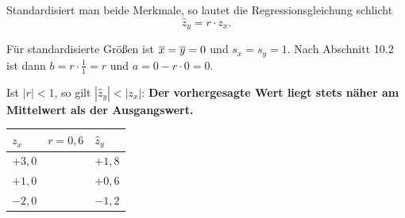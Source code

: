 \begin{merksatz}
Standardisiert man beide Merkmale, so lautet die Regressionsgleichung schlicht
\[ \hat z_y = r \cdot z_x . \]

Für standardisierte Größen ist $\overline{x} = \overline y = 0$ und $s_x = s_y = 1$. Nach Abschnitt 10.2 ist dann $b = r \cdot \frac{1}{1} = r$ und $a = 0 - r\cdot 0 = 0$.

Ist $|r| < 1$, so gilt $|\hat z_y| < |z_x|$: \textbf{Der vorhergesagte Wert liegt stets näher am Mittelwert als der Ausgangswert.}

\begin{center}
\renewcommand{\arraystretch}{1.48}
\begin{tabular}{@{}P{2.6cm}P{2.2cm}P{2.6cm}@{}}
\toprule
$z_x$ & $r = 0{,}6$ & $\hat z_y$\\
\midrule
$+3{,}0$ & & $+1{,}8$\\
$+1{,}0$ & & $+0{,}6$\\
$-2{,}0$ & & $-1{,}2$\\
\bottomrule
\end{tabular}
\end{center}
\end{merksatz}


